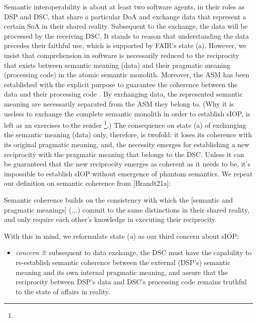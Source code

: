 \documentclass[sort&compress,preprint,authoryear,3p,twocolumn]{elsarticle}
\providecommand{\tightlist}{%
  \setlength{\itemsep}{0pt}\setlength{\parskip}{0pt}}
\begin{document}
Semantic interoperability is about at least two software agents, in
their roles as DSP and DSC, that share a particular DoA and exchange
data that represent a certain SoA in their shared reality. Subsequent to
the exchange, the data will be processed by the receiving DSC. It stands
to reason that understanding the data precedes their faithful use, which
is supported by FAIR's state (a). However, we insist that comprehension
in software is necessarily reduced to the reciprocity that exists
between semantic meaning (data) and their pragmatic meaning (processing
code) in the atomic semantic monolith. Moreover, the ASM has been
established with the explicit purpose to guarantee the coherence between
the data and their processing code \citep{Brandt2021a}. By exchanging
data, the represented semantic meaning are necessarily separated from
the ASM they belong to. (Why it is useless to exchange the complete
semantic monolith in order to establish sIOP, is left as an exercises to
the reader \footnote{}.)
The consequence on state (a) of exchanging the semantic meaning (data)
only, therefore, is twofold: it loses its coherence with its original
pragmatic meaning, and, the necessity emerges for establishing a new
reciprocity with the pragmatic meaning that belongs to the DSC. Unless
it can be guaranteed that the new reciprocity emerges as coherent as it
needs to be, it's impossible to establish sIOP without emergence of
phantom semantics. We repeat our definition on semantic coherence from
{[}Brandt21a{]}:

\begin{mmdef}\label{def:semantic-coherence}
Semantic coherence builds on the consistency with which the [semantic and pragmatic meanings] (...) commit to the same distinctions in their shared reality, and only require each other's knowledge in executing their reciprocity. 
\end{mmdef}

With this in mind, we reformulate state (a) as our third concern about
sIOP:

\begin{itemize}
\tightlist
\item
  \emph{concern 3}: subsequent to data exchange, the DSC must have the
  capability to re-establish semantic coherence between the external
  (DSP's) semantic meaning and its own internal pragmatic meaning, and
  assure that the reciprocity between DSP's data and DSC's processing
  code remains truthful to the state of affairs in reality.
\end{itemize}
\end{document}
